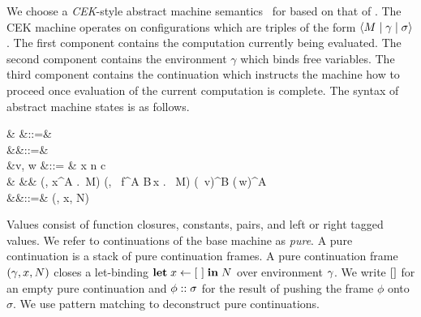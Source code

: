 \documentclass[12pt,phd,lfcs,twoside,openright,logo,leftchapter,normalheadings]{infthesis}
\theoremstyle{plain}
\theoremstyle{definition}
\begin{document}
We choose a \emph{CEK}-style abstract machine
semantics~\citep{FelleisenF86} for \BCalc{} based on that of
\citet{HillerstromLA20}.
%
The CEK machine operates on configurations which are triples of the
form $\langle M \mid \gamma \mid \sigma \rangle$. The first component contains
the computation currently being evaluated. The second component
contains the environment $\gamma$ which binds free variables. The
third component contains the continuation which instructs the machine
how to proceed once evaluation of the current computation is complete.
%
The syntax of abstract machine states is as follows.
{
\begin{syntax}
           & \conf \in \Conf  &::=&  \\
       &\env \in \Env   &::=& \emptyset \mid \env[x \mapsto v] \\
           &v, w \in \MVal  &::= & x \mid n \mid c \mid \Unit \mid {} \\
                                &                &\mid& (\env, \lambda x^A .\, M) \mid (\env, \Rec\, f^{A \to B}\,x . \, M)
                                                  \mid  (\Inl\, v)^B \mid (\Inr\,w)^A \\
            &\sigma \in \PureCont &::=& \nil \mid (\env, x, N) \cons \sigma \\
\end{syntax}}%
%
Values consist of function closures, constants, pairs, and left or
right tagged values.
%
We refer to continuations of the base machine as \emph{pure}.
%
A pure continuation is a stack of pure continuation frames. A pure
continuation frame $(\gamma, x, N)$ closes a let-binding $\mathbf{let} \;x
\leftarrow [~] \;\mathbf{in}\;N$ over environment $\gamma$.
%
We write $[]$ for an empty pure continuation and $\phi :: \sigma$
for the result of pushing the frame $\phi$ onto $\sigma$. We use
pattern matching to deconstruct pure continuations.
%
\end{document}
